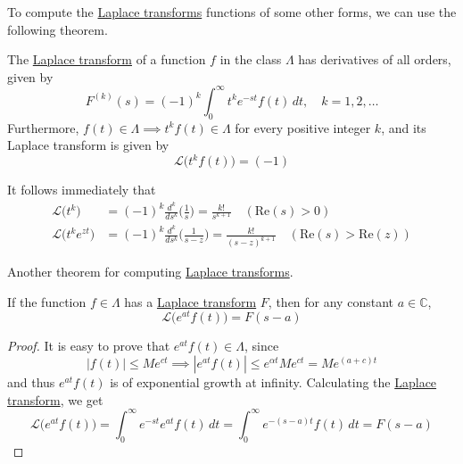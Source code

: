\documentclass{article}
\newcounter{theorem}[section]
\begin{document}
    To compute the \hyperref[def:laplace-transform]{Laplace transforms} functions of some other forms, we can use the following theorem. 

    \begin{theorem}
      \label{thm:derivatives-of-the-laplace-transform}
    The \hyperref[def:laplace-transform]{Laplace transform} of a function $f$ in the class $\Lambda$ has derivatives of all orders, given by
    \begin{equation}
      F^{(k)} (s) = (-1)^k \int_0^\infty t^k e^{-st} f(t)\,dt, \quad k = 1, 2, \ldots
    \end{equation}
    Furthermore, $f(t) \in \Lambda \implies t^k f(t) \in \Lambda$ for every positive integer $k$, and its Laplace transform is given by
    \begin{equation}
      \mathcal{L}\big( t^k f(t) \big) = (-1)
    \end{equation}
    \end{theorem}

    \begin{corollary}
      \label{thm:laplace-transform-of-tk}
    It follows immediately that
    \begin{align*}
        \mathcal{L}\big( t^k\big) & = (-1)^k \frac{d^k}{d s^k} \bigg( \frac{1}{s} \bigg) = \frac{k!}{s^{k+1}} \quad (\text{Re}(s) > 0) \\
        \mathcal{L}\big( t^k e^{zt}\big) & = (-1)^k \frac{d^k}{ds^k} \bigg( \frac{1}{s-z} \bigg) = \frac{k!}{(s-z)^{k+1}} \quad (\text{Re}(s) > \text{Re}(z))
    \end{align*}
    \end{corollary}

    Another theorem for computing \hyperref[def:laplace-transform]{Laplace transforms}. 

    \begin{theorem}
      \label{thm:first-shifting-theorem}
    If the function $f \in \Lambda$ has a \hyperref[def:laplace-transform]{Laplace transform} $F$, then for any constant $a \in \mathbb{C}$, 
    \begin{equation}
      \mathcal{L}\big(e^{at} f(t) \big) = F(s-a)
    \end{equation}
    \end{theorem}
    \begin{proof}
    It is easy to prove that $e^{at} f(t) \in \Lambda$, since 
    \begin{equation}
      |f(t)| \leq M e^{ct} \implies |e^{at} f(t)| \leq e^{\alpha t} M e^{ct} = M e^{(a+c)t}
    \end{equation}
    and thus $e^{at} f(t)$ is of exponential growth at infinity. Calculating the \hyperref[def:laplace-transform]{Laplace transform}, we get
    \begin{equation}
      \mathcal{L}\big(e^{at} f(t) \big) = \int_0^\infty e^{-st} e^{at} f(t) \,dt = \int_0^\infty e^{-(s-a)t} f(t) \,dt = F(s - a)
    \end{equation}
    \end{proof}
\end{document}
